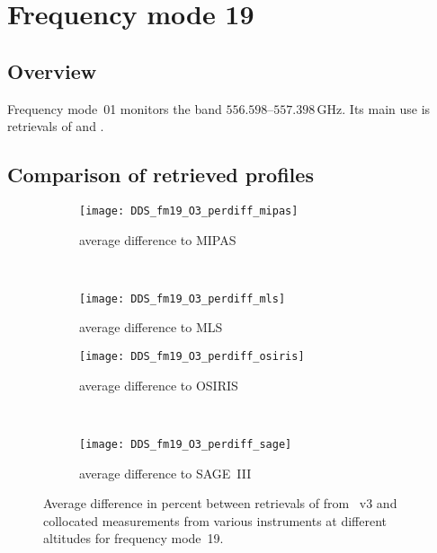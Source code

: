 \section{Frequency mode 19}
\label{sec:fm19}

\subsection{Overview}
\label{sec:fm19:overview}
Frequency mode~01 monitors the band $556.598$--$557.398\,\mathrm{GHz}$. Its
main use is retrievals of  and .


\subsection{Comparison of retrieved profiles}
\label{sec:fm19:comparison}



\begin{figure}[htpb]
    \centering
    \begin{subfigure}[b]{0.49\textwidth}
        \texttt{[image: DDS\_fm19\_O3\_perdiff\_mipas]}
        \caption{average difference to MIPAS}
        \label{fig:fm19:O3:profiles:MIPAS}
    \end{subfigure}
    \,
    \begin{subfigure}[b]{0.49\textwidth}
        \texttt{[image: DDS\_fm19\_O3\_perdiff\_mls]}
        \caption{average difference to MLS}
        \label{fig:fm19:O3:profiles:MLS}
    \end{subfigure}

    \begin{subfigure}[b]{0.49\textwidth}
        \texttt{[image: DDS\_fm19\_O3\_perdiff\_osiris]}
        \caption{average difference to OSIRIS}
        \label{fig:fm19:O3:profiles:OSIRIS}
    \end{subfigure}
    \,
    \begin{subfigure}[b]{0.49\textwidth}
        \texttt{[image: DDS\_fm19\_O3\_perdiff\_sage]}
        \caption{average difference to SAGE~III}
        \label{fig:fm19:O3:profiles:SAGEIII}
    \end{subfigure}
    \caption{Average difference in percent between retrievals of 
    from \smr~v3 and collocated measurements from various instruments at
    different altitudes for frequency mode~19.}

    \label{fig:fm19:O3:profiles}
\end{figure}

